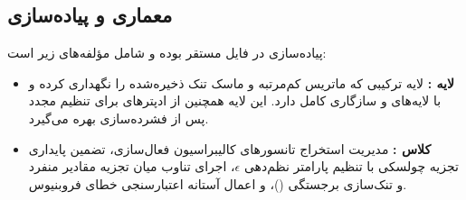 \subsection{معماری و پیاده‌سازی}
پیاده‌سازی  در فایل  مستقر بوده و شامل مؤلفه‌های زیر است:
\begin{itemize}
    \item \textbf{لایه :} لایه ترکیبی که ماتریس کم‌مرتبه و ماسک تنک ذخیره‌شده را نگهداری کرده و با لایه‌های  و  سازگاری کامل دارد. این لایه همچنین از ادپترهای  برای تنظیم مجدد پس از فشرده‌سازی بهره می‌گیرد.
    \item \textbf{کلاس :} مدیریت استخراج تانسورهای کالیبراسیون فعال‌سازی، تضمین پایداری تجزیه چولسکی با تنظیم پارامتر نظم‌دهی $\epsilon$، اجرای تناوب میان تجزیه مقادیر منفرد و تنک‌سازی برجستگی ()، و اعمال آستانه اعتبارسنجی خطای فروبنیوس.
\end{itemize}
